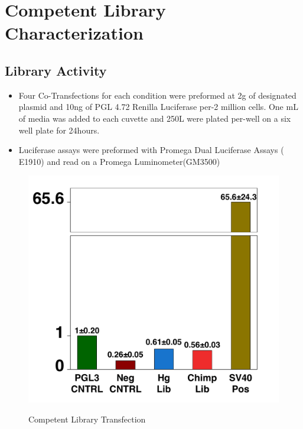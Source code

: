 \documentclass[a4paper]{article}
\begin{document}
\section{Competent Library Characterization}  

	\subsection{Library Activity}
    	\begin{itemize}
        
        	\item Four Co-Transfections for each condition were preformed at 2\textmu g of designated plasmid and 10ng of PGL 4.72 Renilla Luciferase per-2 million cells. One mL of media was added to each cuvette and 250\textmu L were plated per-well on a six well plate for 24hours.
            
            \item Luciferase assays were preformed with Promega Dual Luciferase Assays (	E1910) and read on a Promega Luminometer(GM3500) 
        
        \end{itemize}
    	 
        \begin{figure}[H]
			\centering
			\includegraphics[width=1\textwidth]{2016_07_08_IndvLibs_VersusCNTRLsFINAL.pdf}
			\label{fig:Lib_Act}
			\caption{Competent Library Transfection}
        \end{figure}
    
\end{document}
